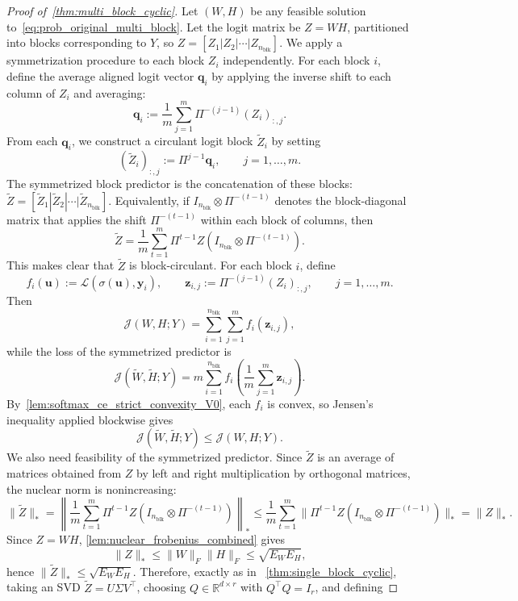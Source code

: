 \documentclass[11pt]{article}
\begin{document}
\begin{proof}[Proof of~\cref{thm:multi_block_cyclic}]
Let \((W,H)\) be any feasible solution to~\cref{eq:prob_original_multi_block}. Let the logit matrix be \(Z = WH\), partitioned into blocks corresponding to \(Y\), so \(Z = [Z_1 | Z_2 | \cdots | Z_{n_{\mathrm{blk}}}]\). We apply a symmetrization procedure to each block \(Z_i\) independently. For each block \(i\), define the average aligned logit vector \(\boldsymbol{q}_i\) by applying the inverse shift to each column of \(Z_i\) and averaging:
\[ \boldsymbol{q}_i := \frac{1}{m}\sum_{j=1}^{m} \Pi^{-(j-1)}(Z_i)_{:,j}. \]
From each \(\boldsymbol{q}_i\), we construct a circulant logit block \(\widetilde{Z}_i\) by setting
\[ (\widetilde{Z}_i)_{:,j}:=\Pi^{j-1}\boldsymbol q_i,\qquad j=1,\ldots,m. \]
The symmetrized block predictor is the concatenation of these blocks: \(\widetilde{Z} = [\widetilde{Z}_1 | \widetilde{Z}_2 | \cdots | \widetilde{Z}_{n_{\mathrm{blk}}}]\).
Equivalently, if \(I_{n_{\mathrm{blk}}}\otimes \Pi^{-(t-1)}\) denotes the block-diagonal matrix that applies the shift
\(\Pi^{-(t-1)}\) within each block of columns, then
\[
\widetilde Z
=
\frac1m\sum_{t=1}^{m} \Pi^{t-1} Z (I_{n_{\mathrm{blk}}}\otimes \Pi^{-(t-1)}).
\]
This makes clear that \(\widetilde Z\) is block-circulant.
For each block \(i\), define
\[
f_i(\boldsymbol u):=\mathcal L(\sigma(\boldsymbol u),\boldsymbol{y}_i),
\qquad
\boldsymbol z_{i,j}:=\Pi^{-(j-1)}(Z_i)_{:,j},\qquad j=1,\ldots,m.
\]
Then
\[
\mathcal J(W,H;Y)=\sum_{i=1}^{n_{\mathrm{blk}}}\sum_{j=1}^{m} f_i(\boldsymbol z_{i,j}),
\]
while the loss of the symmetrized predictor is
\[
\mathcal J(\widetilde W,\widetilde H;Y)
=
m\sum_{i=1}^{n_{\mathrm{blk}}} f_i \left(\frac1m\sum_{j=1}^{m}\boldsymbol z_{i,j}\right).
\]
By~\cref{lem:softmax_ce_strict_convexity_V0}, each \(f_i\) is convex, so Jensen's inequality applied blockwise gives
\[
\mathcal J(\widetilde W,\widetilde H;Y)\le \mathcal J(W,H;Y).
\]
We also need feasibility of the symmetrized predictor. Since \(\widetilde Z\) is an average of matrices obtained from \(Z\) by left and right multiplication by orthogonal matrices, the nuclear norm is nonincreasing:
\[
\|\widetilde Z\|_*
=
\left\|
\frac1m\sum_{t=1}^{m} \Pi^{t-1} Z (I_{n_{\mathrm{blk}}}\otimes \Pi^{-(t-1)})
\right\|_*
\le
\frac1m\sum_{t=1}^{m}\|\Pi^{t-1} Z (I_{n_{\mathrm{blk}}}\otimes \Pi^{-(t-1)})\|_*
=
\|Z\|_*.
\]
Since \(Z=WH\), \cref{lem:nuclear_frobenius_combined} gives
\[
\|Z\|_*\le \|W\|_F\|H\|_F\le \sqrt{E_WE_H},
\]
hence \(\|\widetilde Z\|_*\le \sqrt{E_WE_H}\). Therefore, exactly as in
~\cref{thm:single_block_cyclic}, taking an SVD \(\widetilde Z=U\Sigma V^\top\), choosing \(Q\in\mathbb R^{d\times r}\) with \(Q^\top Q=I_r\), and defining

\end{proof}
\end{document}
